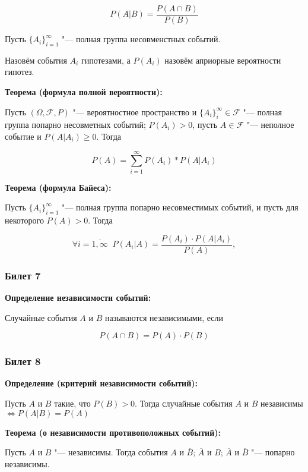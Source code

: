     \[
        P(A|B) = \frac{P(A \cap B)}{P(B)}    
    \]
    \bigskip

Пусть $\{A_i\}_{i = 1}^{\infty}$ "--- полная
группа несовменстных событий.

Назовём события $A_i$ гипотезами, а $P(A_i)$
назовём априорные вероятности гипотез.
\bigskip

\textbf{Теорема (формула полной вероятности):}
    \smallskip

    Пусть $(\Omega, \mathcal{F}, P)$ "--- 
    вероятностное пространство и
    $\{A_i\}_i^{\infty} \in \mathcal{F}$ "---
    полная группа попарно несовметных событий;
    $P(A_i) > 0$, пусть $A \in \mathcal{F}$ "---
    неполное событие и $P(A|A_i) \geq 0$. Тогда

    \[
        P(A) = \sum_{i = 1}^{\infty} P(A_i) *
        P(A|A_i)    
    \]
    \bigskip

\textbf{Теорема (формула Байеса):}
    \smallskip
    
    Пусть $\{A_i\}_{i = 1}^{\infty}$ "--- полная
    группа попарно несовместимых событий, и 
    пусть для некоторого $P(A) > 0$. Тогда

    \[
        \forall i = \overline{1, \infty} \;\;
        P(A_i|A) = \frac{P(A_i)\cdot P(A|A_i)}{P(A)},  
    \]
    \bigskip

\subsubsection{Билет 7}

\textbf{Определение независимости событий:}
    \smallskip

    Случайные события $A$ и $B$ называются 
    независимыми, если 

    \[
        P(A \cap B) = P(A)\cdot P(B)  
    \]
    \bigskip

\subsubsection{Билет 8}

\textbf{Определение (критерий независимости
событий):}
    \smallskip

    Пусть $A$ и $B$ такие, что $P(B) > 0$.
    Тогда случайные события $A$ и $B$ независимы
    $\Leftrightarrow  P(A|B) = P(A)$
    \bigskip

\textbf{Теорема (о независимости противоположных
событий):}
    \smallskip
    
    Пусть $A$ и $B$ "--- независимы. Тогда события
    $A$ и $\overline{B}$; $\overline{A}$ и $B$;
    $\overline{A}$ и $\overline{B}$ "--- попарно
    независимы.
    \bigskip

